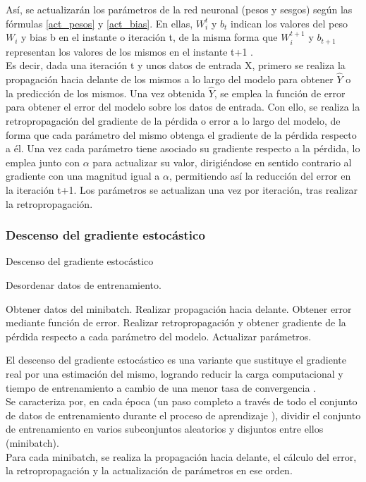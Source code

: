 Así, se actualizarán los parámetros de la red neuronal (pesos y sesgos) según las fórmulas \ref{act_pesos} y \ref{act_bias}. En ellas, $W^t_i$ y $b_t$ indican los valores del peso $W_i$ y bias b en el instante o iteración t, de la misma forma que $W^{t+1}_i$ y $b_{t+1}$ representan los valores de los mismos en el instante t+1 \cite{SGD_act_params}. \\
Es decir, dada una iteración t y unos datos de entrada X, primero se realiza la propagación hacia delante de los mismos a lo largo del modelo para obtener  $\hat{Y}$ o la predicción de los mismos. Una vez obtenida $\hat{Y}$, se emplea la función de error para obtener el error del modelo sobre los datos de entrada. Con ello, se realiza la retropropagación del gradiente de la pérdida o error a lo largo del modelo, de forma que cada parámetro del mismo obtenga el gradiente de la pérdida respecto a él. Una vez cada parámetro tiene asociado su gradiente respecto a la pérdida, lo emplea junto con $\alpha$ para actualizar su valor, dirigiéndose en sentido contrario al gradiente con una magnitud igual a $\alpha$, permitiendo así la reducción del error en la iteración t+1. Los parámetros se actualizan una vez por iteración, tras realizar la retropropagación.

\subsubsection{Descenso del gradiente estocástico}

\begin{algorithm}[H]
	\caption{Descenso del gradiente estocástico \cite{SGD_3}} 
	\begin{algorithmic}
			\State Desordenar datos de entrenamiento.
			
				\State Obtener datos del minibatch.
				\State Realizar propagación hacia delante.
				\State Obtener error mediante función de error.
				\State Realizar retropropagación y obtener gradiente de la pérdida   
				\State       respecto a cada parámetro del modelo.
				\State Actualizar parámetros.
			\EndFor
		\EndFor
	\end{algorithmic}
\end{algorithm}

El descenso del gradiente estocástico es una variante que sustituye el gradiente real por una estimación del mismo, logrando reducir la carga computacional y tiempo de entrenamiento a cambio de una menor tasa de convergencia \cite{sgd_stocastico} \cite{sgd_stocastico_1}. \\
Se caracteriza por, en cada época (un paso completo a través de todo el conjunto de datos de entrenamiento durante el proceso de aprendizaje \cite{sgd_stocastico}), dividir el conjunto de entrenamiento en varios subconjuntos aleatorios y disjuntos entre ellos (minibatch). \\
Para cada minibatch, se realiza la propagación hacia delante, el cálculo del error, la retropropagación y la actualización de parámetros en ese orden. \\


